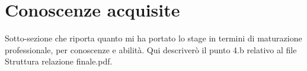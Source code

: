 \section{Conoscenze acquisite}

Sotto-sezione che riporta quanto mi ha portato lo stage in termini di maturazione professionale, per conoscenze e abilità.
Qui descriverò il punto 4.b relativo al file Struttura relazione finale.pdf.